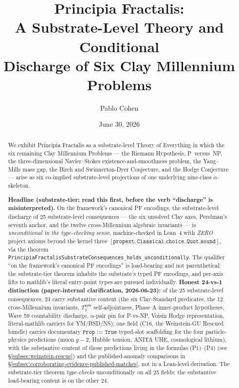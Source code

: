 \documentclass[11pt,a4paper]{amsart}
\title[Principia Fractalis: A Substrate-Level Theory and Six Clay Discharges]{Principia Fractalis:\\ A Substrate-Level Theory and Conditional\\ Discharge of Six Clay Millennium Problems}
\author{Pablo Cohen}
\date{June 30, 2026}
\theoremstyle{plain}
\theoremstyle{definition}
\begin{document}
\begin{abstract}
We exhibit Principia Fractalis as a substrate-level Theory of Everything in which the six remaining Clay Millennium Problems --- the Riemann Hypothesis, P~versus~NP, the three-dimensional Navier--Stokes existence-and-smoothness problem, the Yang--Mills mass gap, the Birch and Swinnerton-Dyer Conjecture, and the Hodge Conjecture --- arise as six co-implied substrate-level projections of one underlying nine-class $\alpha$-skeleton.

\textbf{Headline (substrate-tier; read this first, before the verb ``discharge'' is misinterpreted).} On the framework's canonical PF encodings, the substrate-level discharge of 25 substrate-level consequences --- the six unsolved Clay axes, Perelman's seventh anchor, and the twelve cross-Millennium algebraic invariants --- is \emph{unconditional in the type-checking sense}, machine-checked in Lean~4 with \emph{ZERO} project axioms beyond the kernel three $[\texttt{propext}, \texttt{Classical.choice}, \texttt{Quot.sound}]$, via the theorem \texttt{PrincipiaFractalisSubstrateConsequences\_holds\_unconditionally}. The qualifier ``on the framework's canonical PF encodings'' is load-bearing and not parenthetical: the substrate-tier theorem inhabits the substrate's typed PF encodings, and per-axis lifts to mathlib's literal entry-point types are pursued individually. \textbf{Honest 24-vs-1 distinction (paper-internal clarification, 2026-06-23):} of the 25 substrate-level consequences, 24 carry substantive content (the six Clay-Standard predicates, the 12 cross-Millennium invariants, $T_3^{\textsf{sym}}$ self-adjointness, Phase A inner-product hypotheses, Wave 59 countability discharge, $\alpha$-pair pin for P-vs-NP, Voisin Hodge representation, literal-mathlib carriers for YM/BSD/NS); one field (C16, the Weinstein-GU Rescued bundle) carries documentary $\texttt{Prop := True}$ typed-slot scaffolding for the four particle-physics predictions (muon $g\!-\!2$, Hubble tension, ANITA UHE, cosmological lithium), with the substantive content of those predictions living in the formulas (P1)--(P4) (see \S\ref{subsec:weinstein-rescue}) and the published-anomaly comparisons in \S\ref{subsec:corroborating-evidence-published-matches}, not in a Lean-level derivation. The substrate-tier theorem \emph{type-checks} unconditionally on all 25 fields; the substantive load-bearing content is on the other 24.


\end{abstract}
\end{document}
